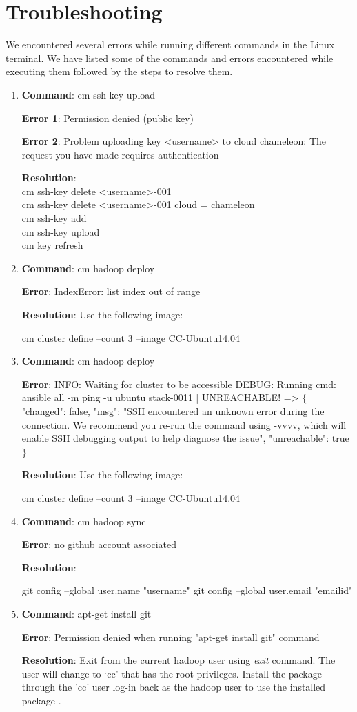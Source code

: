 \documentclass[9pt,twocolumn,twoside]{../../styles/osajnl}
\begin{document}
\section{Troubleshooting}
We encountered several errors while running different commands in the Linux terminal. We have listed some of the commands and errors encountered while executing them followed by the steps to resolve them.
\begin{enumerate}
 \item \textbf{Command}: cm ssh key upload
 
 \textbf{Error 1}: Permission denied (public key)
 
 \textbf{Error 2}: Problem uploading key <username> to cloud chameleon:
 The request you have made requires authentication
 
 \textbf{Resolution}: \\
 cm ssh-key delete <username>-001\\
 cm ssh-key delete <username>-001 cloud = chameleon\\
 cm ssh-key add\\
 cm ssh-key upload\\
 cm key refresh
 
 \item \textbf{Command}: cm hadoop deploy
 
 \textbf{Error}: IndexError: list index out of range

 \textbf{Resolution}: Use the following image:
 
cm cluster define --count 3 --image CC-Ubuntu14.04

\item \textbf{Command}: cm hadoop deploy

 \textbf{Error}: INFO: Waiting for cluster to be accessible
DEBUG: Running cmd: ansible all -m ping -u ubuntu
stack-0011 | UNREACHABLE! => $\{$
"changed": false, 
"msg": "SSH encountered an unknown error during the 
connection. We recommend you re-run the command using 
-vvvv, which will enable SSH debugging output to help 
diagnose the issue", 
"unreachable": true
$\}$

\textbf{Resolution}: Use the following image:

cm cluster define --count 3 --image CC-Ubuntu14.04


 \item \textbf{Command}: cm hadoop sync
 
 \textbf{Error}: no github account associated
 
 \textbf{Resolution}: 
 
 git config --global user.name "username"
 git config --global user.email "emailid"
 

 \item \textbf{Command}: apt-get install git
 
 \textbf{Error}: Permission denied when running "apt-get install git" command
 
 \textbf{Resolution}: Exit from the current hadoop user using \textit{exit} command. The user will change to ‘cc’ that has the root privileges. Install  the package through the 'cc' user log-in back as the hadoop user to use the installed package .
\end{enumerate}
\end{document}
